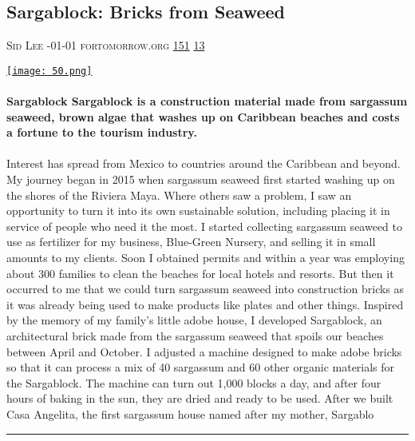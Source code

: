 \documentclass[10pt,a4paper]{article}
\begin{document}
\begin{multicols*}{2}
\begin{minipage}{\linewidth}
\subsection{Sargablock: Bricks from Seaweed}
\textsc{\footnotesize
{\scriptsize\faUser}\space 
Sid Lee 
{\scriptsize\faCalendar}-01-01 
{\scriptsize\faGlobe}\space 
fortomorrow.org 
{\scriptsize\faThumbsOUp}\space 
\href{http://news.ycombinator.com/item?id=37175721\&utm\_term=comment}{151} 
{\scriptsize\faComments}\space 
\href{http://news.ycombinator.com/item?id=37175721\&utm\_term=comment}{13} 
}
\par\medskip\noindent
\href{https://fortomorrow.org/explore-solutions/sargablock?utm\_source=hackernewsletter\&utm\_medium=email\&utm\_term=learn}{
    \texttt{[image: 50.png]}
}
\end{minipage}
\paragraph{}
\textbf{Sargablock
Sargablock is a construction material made from sargassum seaweed, brown algae that washes up on Caribbean beaches and costs a fortune to the tourism industry.}
\paragraph{}
 Interest has spread from Mexico to countries around the Caribbean and beyond.
My journey began in 2015 when sargassum seaweed first started washing up on the shores of the Riviera Maya. Where others saw a problem, I saw an opportunity to turn it into its own sustainable solution, including placing it in service of people who need it the most.
I started collecting sargassum seaweed to use as fertilizer for my business, Blue-Green Nursery, and selling it in small amounts to my clients. Soon I obtained permits and within a year was employing about 300 families to clean the beaches for local hotels and resorts. But then it occurred to me that we could turn sargassum seaweed into construction bricks as it was already being used to make products like plates and other things. Inspired by the memory of my family’s little adobe house, I developed Sargablock, an architectural brick made from the sargassum seaweed that spoils our beaches between April and October.
I adjusted a machine designed to make adobe bricks so that it can process a mix of 40 sargassum and 60 other organic materials for the Sargablock. The machine can turn out 1,000 blocks a day, and after four hours of baking in the sun, they are dried and ready to be used. After we built Casa Angelita, the first sargassum house named after my mother, Sargablo
\par\noindent\textcolor{red}{\rule{\linewidth}{0.2mm}}
\vfill
\null
\noindent\begin{minipage}{\linewidth}

\end{minipage}
\end{multicols*}
\end{document}
